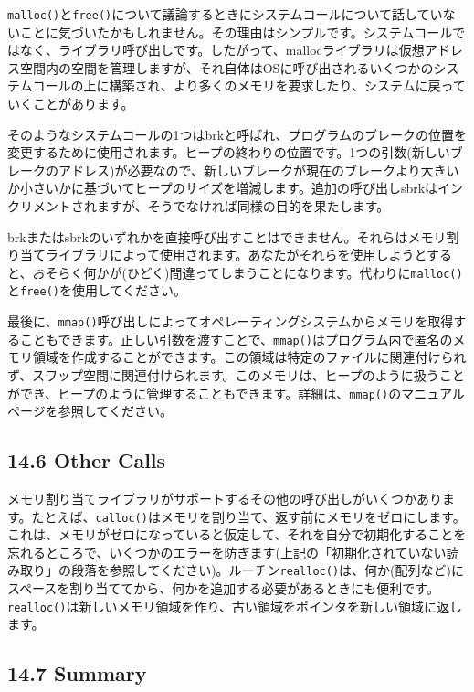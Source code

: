 \texttt{malloc()}と\texttt{free()}について議論するときにシステムコールについて話していないことに気づいたかもしれません。その理由はシンプルです。システムコールではなく、ライブラリ呼び出しです。したがって、mallocライブラリは仮想アドレス空間内の空間を管理しますが、それ自体はOSに呼び出されるいくつかのシステムコールの上に構築され、より多くのメモリを要求したり、システムに戻っていくことがあります。

そのようなシステムコールの1つはbrkと呼ばれ、プログラムのブレークの位置を変更するために使用されます。ヒープの終わりの位置です。1つの引数(新しいブレークのアドレス)が必要なので、新しいブレークが現在のブレークより大きいか小さいかに基づいてヒープのサイズを増減します。追加の呼び出しsbrkはインクリメントされますが、そうでなければ同様の目的を果たします。

brkまたはsbrkのいずれかを直接呼び出すことはできません。それらはメモリ割り当てライブラリによって使用されます。あなたがそれらを使用しようとすると、おそらく何かが(ひどく)間違ってしまうことになります。代わりに\texttt{malloc()}と\texttt{free()}を使用してください。

最後に、\texttt{mmap()}呼び出しによってオペレーティングシステムからメモリを取得することもできます。正しい引数を渡すことで、\texttt{mmap()}はプログラム内で匿名のメモリ領域を作成することができます。この領域は特定のファイルに関連付けられず、スワップ空間に関連付けられます。このメモリは、ヒープのように扱うことができ、ヒープのように管理することもできます。詳細は、\texttt{mmap()}のマニュアルページを参照してください。

\hypertarget{other-calls}{%
\subsection*{14.6 Other Calls}\label{other-calls}}

メモリ割り当てライブラリがサポートするその他の呼び出しがいくつかあります。たとえば、\texttt{calloc()}はメモリを割り当て、返す前にメモリをゼロにします。これは、メモリがゼロになっていると仮定して、それを自分で初期化することを忘れるところで、いくつかのエラーを防ぎます(上記の「初期化されていない読み取り」の段落を参照してください)。ルーチン\texttt{realloc()}は、何か(配列など)にスペースを割り当ててから、何かを追加する必要があるときにも便利です。\texttt{realloc()}は新しいメモリ領域を作り、古い領域をポインタを新しい領域に返します。

\hypertarget{summary-7}{%
\subsection*{14.7 Summary}\label{summary-7}}

